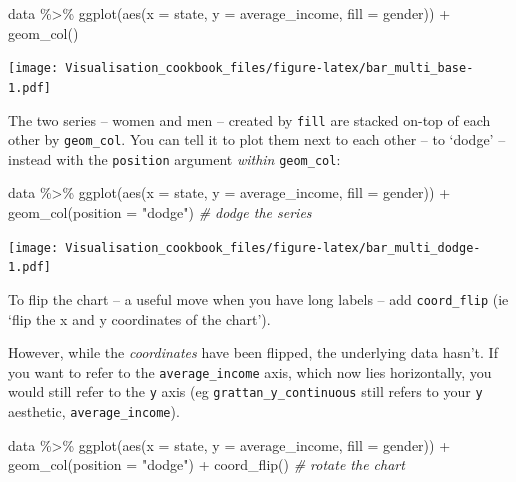 \documentclass[
]{book}
\newenvironment{Shaded}{\begin{snugshade}}{\end{snugshade}}
\newcommand{\AttributeTok}[1]{\textcolor[rgb]{0.77,0.63,0.00}{#1}}
\newcommand{\CommentTok}[1]{\textcolor[rgb]{0.56,0.35,0.01}{\textit{#1}}}
\newcommand{\FunctionTok}[1]{\textcolor[rgb]{0.00,0.00,0.00}{#1}}
\newcommand{\NormalTok}[1]{#1}
\newcommand{\SpecialCharTok}[1]{\textcolor[rgb]{0.00,0.00,0.00}{#1}}
\newcommand{\StringTok}[1]{\textcolor[rgb]{0.31,0.60,0.02}{#1}}
\begin{document}
\begin{Shaded}
\begin{Highlighting}[]
\NormalTok{data }\SpecialCharTok{\%\textgreater{}\%} 
  \FunctionTok{ggplot}\NormalTok{(}\FunctionTok{aes}\NormalTok{(}\AttributeTok{x =}\NormalTok{ state,}
             \AttributeTok{y =}\NormalTok{ average\_income,}
             \AttributeTok{fill =}\NormalTok{ gender)) }\SpecialCharTok{+} 
  \FunctionTok{geom\_col}\NormalTok{()}
\end{Highlighting}
\end{Shaded}

\texttt{[image: Visualisation\_cookbook\_files/figure-latex/bar\_multi\_base-1.pdf]}

The two series -- women and men -- created by \texttt{fill} are stacked on-top of each other by \texttt{geom\_col}. You can tell it to plot them next to each other -- to `dodge' -- instead with the \texttt{position} argument \emph{within} \texttt{geom\_col}:

\begin{Shaded}
\begin{Highlighting}[]
\NormalTok{data }\SpecialCharTok{\%\textgreater{}\%} 
  \FunctionTok{ggplot}\NormalTok{(}\FunctionTok{aes}\NormalTok{(}\AttributeTok{x =}\NormalTok{ state,}
             \AttributeTok{y =}\NormalTok{ average\_income,}
             \AttributeTok{fill =}\NormalTok{ gender)) }\SpecialCharTok{+} 
  \FunctionTok{geom\_col}\NormalTok{(}\AttributeTok{position =} \StringTok{"dodge"}\NormalTok{) }\CommentTok{\# \textquotesingle{}dodge\textquotesingle{} the series}
\end{Highlighting}
\end{Shaded}

\texttt{[image: Visualisation\_cookbook\_files/figure-latex/bar\_multi\_dodge-1.pdf]}

To flip the chart -- a useful move when you have long labels -- add \texttt{coord\_flip} (ie `flip the x and y coordinates of the chart').

However, while the \emph{coordinates} have been flipped, the underlying data hasn't. If you want to refer to the \texttt{average\_income} axis, which now lies horizontally, you would still refer to the \texttt{y} axis (eg \texttt{grattan\_y\_continuous} still refers to your \texttt{y} aesthetic, \texttt{average\_income}).

\begin{Shaded}
\begin{Highlighting}[]
\NormalTok{data }\SpecialCharTok{\%\textgreater{}\%} 
  \FunctionTok{ggplot}\NormalTok{(}\FunctionTok{aes}\NormalTok{(}\AttributeTok{x =}\NormalTok{ state,}
             \AttributeTok{y =}\NormalTok{ average\_income,}
             \AttributeTok{fill =}\NormalTok{ gender)) }\SpecialCharTok{+} 
  \FunctionTok{geom\_col}\NormalTok{(}\AttributeTok{position =} \StringTok{"dodge"}\NormalTok{) }\SpecialCharTok{+} 
  \FunctionTok{coord\_flip}\NormalTok{() }\CommentTok{\# rotate the chart}
\end{Highlighting}
\end{Shaded}
\end{document}
